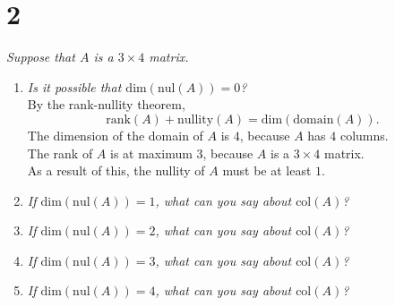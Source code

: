 \documentclass[12pt]{article}
\begin{document}
\section*{2}
\textit{Suppose that $A$ is a $3 \times 4$ matrix.}
\begin{enumerate}[label=(\alph*)]
	\item \textit{Is it possible that $\text{dim}(\text{nul}(A)) = 0$?}
	\\[\baselineskip]
	 By the rank-nullity theorem,
	\begin{equation*}
		\text{rank}(A) + \text{nullity}(A) = \text{dim}(\text{domain}(A))
		.
	\end{equation*}
	The dimension of the domain of $A$ is $4$, because $A$ has $4$ columns. \\
	The rank of $A$ is at maximum 3, because $A$ is a $3 \times 4$ matrix. \\
	As a result of this, the nullity of $A$ must be at least $1$.
	
	\item \textit{If $\text{dim}(\text{nul}(A)) = 1$, what can you say about
	$\text{col}(A)$?} \\[\baselineskip]

	\item \textit{If $\text{dim}(\text{nul}(A)) = 2$, what can you say about
	$\text{col}(A)$?} \\[\baselineskip]
	
	\item \textit{If $\text{dim}(\text{nul}(A)) = 3$, what can you say about
	$\text{col}(A)$?} \\[\baselineskip]
	
	\item \textit{If $\text{dim}(\text{nul}(A)) = 4$, what can you say about
	$\text{col}(A)$?} \\[\baselineskip]
\end{enumerate}
\newpage
\end{document}
